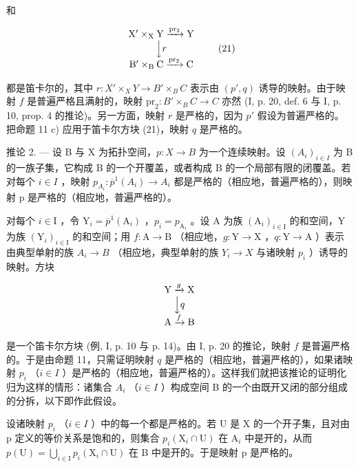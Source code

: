 和

\[
\begin{array}{c} \mathrm {X^ {\prime} \times_ {X} Y\xrightarrow {pr_ {2}} Y} \\ \Big \downarrow r \\ \mathrm {B^ {\prime} \times_ {B} C\xrightarrow {pr_ {2}} C} \end{array}\tag{21}
\]

都是笛卡尔的，其中 \(r \colon X' \times_{X} Y \to B' \times_{B} C\) 表示由 \((p', q)\) 诱导的映射。由于映射 \(f\) 是普遍严格且满射的，映射 \(\mathrm{pr}_2 \colon B' \times_{B} C \to C\) 亦然 (I, p. 20, def. 6 与 I, p. 10, prop. 4 的推论)。另一方面，映射 \(r\) 是严格的，因为 \(p'\) 假设为普遍严格的。把命题 11 c) 应用于笛卡尔方块 (21)，映射 \(q\) 是严格的。

推论 2. --- 设 B 与 X 为拓扑空间，\(p\colon X \to B\) 为一个连续映射。设 \((A_i)_{i \in I}\) 为 B 的一族子集，它构成 B 的一个开覆盖，或者构成 B 的一个局部有限的闭覆盖。若对每个 \(i \in I\) ，映射 \(p_{A_i}\colon \overline{p}^1(A_i) \to A_i\) 都是严格的（相应地，普遍严格的），则映射 p 是严格的（相应地，普遍严格的）。

对每个 \(i \in \mathrm{I}\) ，令 \(\mathrm{Y}_i = \overline{p}^{1}(\mathrm{A}_i)\) ，\(p_i = p_{\mathrm{A}_i}\) 。设 A 为族 \((\mathrm{A}_i)_{i \in \mathrm{I}}\) 的和空间，Y 为族 \((\mathrm{Y}_i)_{i \in \mathrm{I}}\) 的和空间；用 \(f: \mathrm{A} \to \mathrm{B}\) （相应地，\(g: \mathrm{Y} \to \mathrm{X}\) ，\(q: \mathrm{Y} \to \mathrm{A}\) ）表示由典型单射的族 \(A_i \rightarrow B\) （相应地，典型单射的族 \(Y_i \rightarrow X\) 与诸映射 \(p_i\) ）诱导的映射。方块

\[
\begin{array}{c} \mathrm{Y} \xrightarrow {g} \mathrm{X} \\ \Big \downarrow q \\ \mathrm{A} \xrightarrow {f} \mathrm{B} \end{array}
\]

是一个笛卡尔方块 (例, I, p. 10 与 p. 14)。由 I, p. 20 的推论，映射 \(f\) 是普遍严格的。于是由命题 11，只需证明映射 \(q\) 是严格的（相应地，普遍严格的），如果诸映射 \(p_i\) （\(i \in I\) ）是严格的（相应地，普遍严格的）。这样我们就把该推论的证明化归为这样的情形：诸集合 \(A_i\) （\(i \in I\) ）构成空间 B 的一个由既开又闭的部分组成的分拆，以下即作此假设。

设诸映射 \(p_i\) （\(i \in I\) ）中的每一个都是严格的。若 U 是 X 的一个开子集，且对由 p 定义的等价关系是饱和的，则集合 \(p_i(\mathrm{X}_i \cap \mathrm{U})\) 在 \(\mathrm{A}_i\) 中是开的，从而 \(p(\mathrm{U}) = \bigcup_{i \in \mathrm{I}} p_i(\mathrm{X}_i \cap \mathrm{U})\) 在 B 中是开的。于是映射 p 是严格的。

